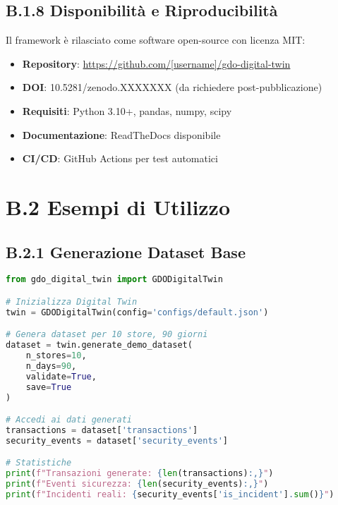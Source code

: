 \subsection{\texorpdfstring{\textbf{B.1.8 Disponibilità e Riproducibilità}}{B.1.8 - Disponibilità e Riproducibilità}}

Il framework è rilasciato come software open-source con licenza MIT:

\begin{itemize}
    \item \textbf{Repository}: \url{https://github.com/[username]/gdo-digital-twin}
    \item \textbf{DOI}: 10.5281/zenodo.XXXXXXX (da richiedere post-pubblicazione)
    \item \textbf{Requisiti}: Python 3.10+, pandas, numpy, scipy
    \item \textbf{Documentazione}: ReadTheDocs disponibile
    \item \textbf{CI/CD}: GitHub Actions per test automatici
\end{itemize}

\section{\texorpdfstring{\textbf{B.2 Esempi di Utilizzo}}{B.2 - Esempi di Utilizzo}}

\subsection{\texorpdfstring{\textbf{B.2.1 Generazione Dataset Base}}{B.2.1 - Generazione Dataset Base}}

\begin{lstlisting}[language=Python, caption={Esempio generazione dataset base}]
from gdo_digital_twin import GDODigitalTwin

# Inizializza Digital Twin
twin = GDODigitalTwin(config='configs/default.json')

# Genera dataset per 10 store, 90 giorni
dataset = twin.generate_demo_dataset(
    n_stores=10,
    n_days=90,
    validate=True,
    save=True
)

# Accedi ai dati generati
transactions = dataset['transactions']
security_events = dataset['security_events']

# Statistiche
print(f"Transazioni generate: {len(transactions):,}")
print(f"Eventi sicurezza: {len(security_events):,}")
print(f"Incidenti reali: {security_events['is_incident'].sum()}")
\end{lstlisting}

